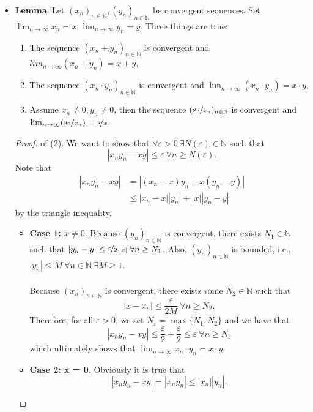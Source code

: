 \documentclass{article}
\newcommand{\N}{\mathbb{N}}
\newcommand{\seq}[2]{(#1_{#2})_{#2 \in \N}}
\newcommand{\?}{\stackrel{?}{=}}
\begin{document}
\begin{itemize}
    \item \textbf{Lemma}. Let $\seq{x}{n}, \seq{y}{n}$ be convergent sequences. Set $\lim_{n \to \infty} x_n = x, \lim_{n \to \infty} y_n = y$. Three things are true:
    \begin{enumerate}[label=(\arabic*)]
        \item The sequence $(x_n + y_n)_{n \in \N}$ is convergent and $lim_{n \to \infty} (x_n + y_n) = x + y$,
        \item The sequence $(x_n \cdot y_n)_{n \in \N}$ is convergent and $\lim_{n \to \infty} (x_n \cdot y_n) = x \cdot y$,
        \item Assume $x_n \neq 0, y_n \neq 0$, then the sequence $(\nicefrac{y_n}{x_n})_{n \in \N}$ is convergent and $\lim_{n \to \infty} (\nicefrac{y_n}{x_n}) = \nicefrac{y}{x}$.
    \end{enumerate}
    \begin{proof}
        of (2). We want to show that $\forall \varepsilon > 0 \ \exists N(\varepsilon) \in \N$ such that
        $$|x_ny_n - xy| \leq \varepsilon \ \forall n \geq N(\varepsilon).$$
        Note that
        \begin{align*}
            |x_ny_n - xy| &= |(x_n - x)y_n + x(y_n - y)| \\
            &\leq |x_n - x||y_n| + |x||y_n - y|
        \end{align*}
        by the triangle inequality.
        \begin{itemize}
            \item \textbf{Case 1: $x \neq 0$}. Because $\seq{y}{n}$ is convergent, there exists $N_1 \in \N$ such that $|y_n - y| \leq \nicefrac{\varepsilon}{2 \cdot |x|} \ \forall n \geq N_1$. Also, $\seq{y}{n}$ is bounded, i.e., $|y_n| \leq M \ \forall n \in \N \ \exists M \geq 1$. \\\\
            Because $\seq{x}{n}$ is convergent, there exists some $N_2 \in \N$ such that
            $$|x - x_n| \leq \frac{\varepsilon}{2M} \ \forall n \geq N_2.$$
            Therefore, for all $\varepsilon > 0$, we set $N_\varepsilon = \max\{N_1, N_2\}$ and we have that
            $$|x_ny_n - xy| \leq \frac{\varepsilon}{2} + \frac{\varepsilon}{2} \leq \varepsilon \ \forall n \geq N_\varepsilon$$
            which ultimately shows that $\lim_{n \to \infty} x_n \cdot y_n = x \cdot y$.
            \item \textbf{Case 2: x = 0}. Obviously it is true that
            $$|x_ny_n - xy| = |x_ny_n| \leq |x_n||y_n|.$$

\end{itemize}
\end{proof}
\end{itemize}
\end{document}
